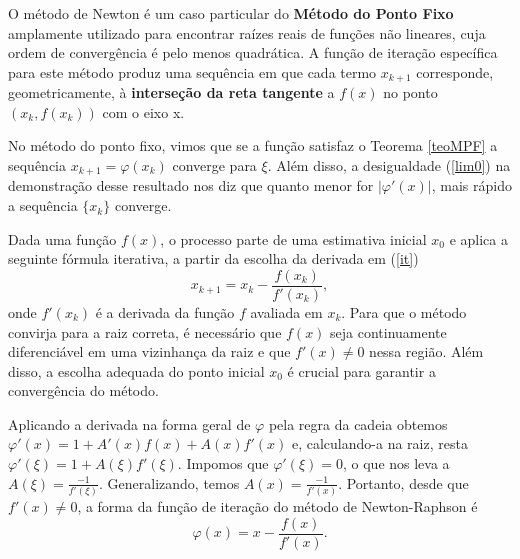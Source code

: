 

O método de Newton é um caso particular do \textbf{Método do Ponto Fixo} amplamente utilizado para encontrar raízes %
reais de funções não lineares, cuja ordem de convergência é pelo menos quadrática. A função de iteração específica para este método produz uma sequência em que cada termo $x_{k+1}$ corresponde, geometricamente, à \textbf{interseção da reta tangente} a $f(x)$ no ponto $(x_k, f(x_k))$ com o eixo x. 

No método do ponto fixo, vimos que se a função satisfaz o Teorema \ref{teoMPF} a sequência $x_{k+1} = \varphi(x_k)$ converge para $\xi$. Além disso, a desigualdade (\ref{lim0}) na demonstração desse resultado nos diz que quanto menor for $|\varphi'(x)|$, mais rápido a sequência $\{x_k\}$ converge.

Dada uma função \(f(x)\), o processo parte de uma estimativa inicial \(x_0\) e aplica a seguinte fórmula iterativa, a partir da escolha da derivada em (\ref{it})
\begin{equation} \label{nr}
    x_{k+1} = x_k - \frac{f(x_k)}{f'(x_k)},
\end{equation}
onde \(f'(x_k)\) é a derivada da função \(f\) avaliada em \(x_k\).
Para que o método convirja para a raiz correta, é necessário que \(f(x)\) seja continuamente diferenciável em uma vizinhança da raiz e que \(f'(x) \neq 0\) nessa região. Além disso, a escolha adequada do ponto inicial \(x_0\) é crucial para garantir a convergência do método.

Aplicando a derivada na forma geral de $\varphi$ pela regra da cadeia obtemos $\varphi'(x) = 1 + A'(x)f(x) + A(x)f'(x)$ e, calculando-a na raiz, resta $\varphi'(\xi) = 1 + A(\xi)f'(\xi)$. Impomos que $\varphi'(\xi) = 0$, o que nos leva a $A(\xi) = \frac{-1}{f'(\xi)}$. Generalizando, temos $A(x) = \frac{-1}{f'(x)}$. Portanto, desde que $f'(x) \neq 0$, a forma da função de iteração do método de Newton-Raphson é 
\begin{equation*}
    \varphi(x) = x - \frac{f(x)}{f'(x)}.
\end{equation*}

